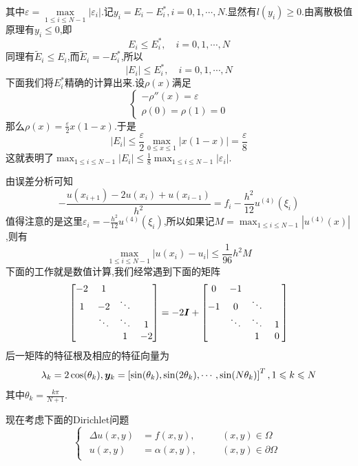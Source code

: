 其中$\varepsilon=\max\limits_{1\leqslant i\leqslant N-1}|\varepsilon_i|$.记$y_i=E_i-E_i^*,i=0,1,\cdots,N$.显然有$l(y_i)\geqslant 0$.由离散极值原理有$y_i\leqslant 0$,即
$$
E_i\leqslant E_i^*,\quad i=0,1,\cdots,N
$$
同理有$\tilde{E}_i\leqslant E_i$,而$\tilde{E}_i=-E^*_i$,所以
$$
|E_i|\leqslant E_i^*,\quad i=0,1,\cdots,N
$$
\qquad 下面我们将$E_i^*$精确的计算出来.设$\rho(x)$满足
$$
\begin{cases}
    -\rho''(x)=\varepsilon\\
    \rho(0)=\rho(1)=0
\end{cases}
$$
那么$\rho(x)=\frac{\varepsilon}{2}x(1-x)$.于是
$$
|E_i|\leqslant \frac{\varepsilon}{2}\max_{0\leqslant x\leqslant 1}|x(1-x)|=\frac{\varepsilon}{8}
$$
这就表明了$\max_{1\leqslant i\leqslant N-1}|E_i|\leqslant \frac{1}{8}\max_{1\leqslant i\leqslant N-1}|\varepsilon_i|$.\par
由误差分析可知
$$
-\frac{u(x_{i+1})-2u(x_i)+u(x_{i-1})}{h^2}=f_i-\frac{h^2}{12}u^{(4)}(\xi_i)
$$
值得注意的是这里$\varepsilon_i=-\frac{h^2}{12}u^{(4)}(\xi_i)$,所以如果记$M=\max_{1\leqslant i\leqslant N-1}|u^{(4)}(x)|$,则有
$$
\max_{1\leqslant i\leqslant N-1}|u(x_i)-u_i|\leqslant \frac{1}{96}h^2M
$$
\qquad 下面的工作就是数值计算,我们经常遇到下面的矩阵
$$
\begin{bmatrix}
-2 & 1 & \quad & \quad\\
1 & -2 & \ddots & \quad\\
\quad & \ddots & \ddots & 1\\
\quad & \quad & 1 & -2
\end{bmatrix}
=
-2\bm{I}+
\begin{bmatrix}
0 & -1 & \quad & \quad\\
-1 & 0 & \ddots & \quad\\
\quad & \ddots & \ddots & 1\\
\quad & \quad & 1 & 0
\end{bmatrix}
$$
后一矩阵的特征根及相应的特征向量为
$$
\lambda_k=2\cos(\theta_k),\bm{y}_k=\left[\sin(\theta_k),\sin(2\theta_k),\cdots,\sin(N\theta_k)\right]^T,1\leqslant k\leqslant N
$$
其中$\theta_k=\frac{k\pi}{N+1}$.\par
现在考虑下面的Dirichlet问题
$$
\begin{cases}
    \begin{alignedat}{2}
        \Delta u(x,y) &= f(x,y),   \quad && (x, y) \in \Omega \\[3pt]
        u(x, y)       &= \alpha(x,y),\quad && (x, y) \in \partial\Omega
    \end{alignedat}
\end{cases}
$$
